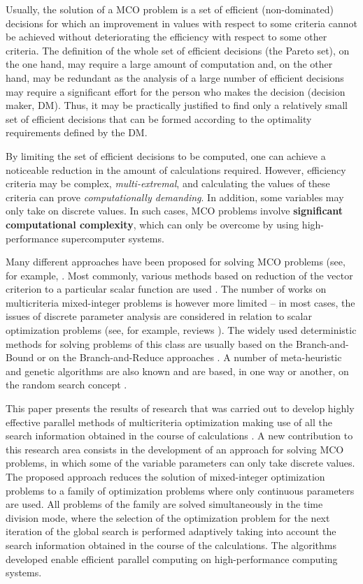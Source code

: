 \documentclass{svproc}
\begin{document}
Usually, the solution of a MCO problem is a set of efficient (non-dominated) decisions for which an improvement in values with respect to some criteria cannot be achieved without deteriorating the efficiency with respect to some other criteria. The definition of the whole set of efficient decisions (the Pareto set), on the one hand, may require a large amount of computation and, on the other hand, may be redundant as the analysis of a large number of efficient decisions may require a significant effort for the person who makes the decision (decision maker, DM). Thus, it may be practically justified to find only a relatively small set of efficient decisions that can be formed according to the optimality requirements defined by the DM. 

By limiting the set of efficient decisions to be computed, one can achieve a noticeable reduction in the amount of calculations required. However, efficiency criteria may be complex, \textit{multi-extremal}, and calculating the values of these criteria can prove \textit{computationally demanding}. In addition, some variables may only take on discrete values. In such cases, MCO problems involve \textbf{significant computational complexity}, which can only be overcome by using high-performance supercomputer systems.

Many different approaches have been proposed for solving MCO problems (see, for example, \cite{c3,c6,c10,c11}.  Most commonly, various methods based on reduction of the vector criterion to a particular scalar function are used \cite{c2,c12}. The number of works on multicriteria mixed-integer problems is however more limited -- in most cases, the issues of discrete parameter analysis are considered in relation to scalar optimization problems (see, for example, reviews \cite{c13,c14}). The widely used deterministic methods for solving problems of this class are usually based on the Branch-and-Bound \cite{c15} or on the Branch-and-Reduce approaches \cite{c16}. A number of meta-heuristic and genetic algorithms are also known and are based, in one way or another, on the random search concept \cite{c17,c18}.

This paper presents the results of research that was carried out to develop highly effective parallel methods of multicriteria optimization making use of all the search information obtained in the course of calculations \cite{c19,c20,c21}. A new contribution to this research area consists in the development of an approach for solving MCO problems, in which some of the variable parameters can only take discrete values. The proposed approach reduces the solution of mixed-integer optimization problems to a family of optimization problems where only continuous parameters are used. All problems of the family are solved simultaneously in the time division mode, where the selection of the optimization problem for the next iteration of the global search is performed adaptively taking into account the search information obtained in the course of the calculations. The algorithms developed enable efficient parallel computing on high-performance computing systems.
\end{document}
